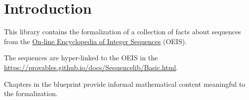 \chapter{Introduction}\label{introduction}

This library contains the formalization of a collection of facts about sequences from 
the \href{https://oeis.org}{On-line Encyclopedia of Integer Sequences} (OEIS).

The sequences are hyper-linked to the OEIS in the 
\href{docs}{https://provables.github.io/docs/Sequencelib/Basic.html}.

Chapters in the blueprint provide informal mathematical content meaningful to the
formalization.

